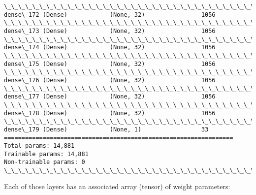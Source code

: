 \documentclass[11pt]{article}
\begin{document}
\begin{Verbatim}[commandchars=\\\{\}]
\_\_\_\_\_\_\_\_\_\_\_\_\_\_\_\_\_\_\_\_\_\_\_\_\_\_\_\_\_\_\_\_\_\_\_\_\_\_\_\_\_\_\_\_\_\_\_\_\_\_\_\_\_\_\_\_\_\_\_\_\_\_\_\_\_
dense\_172 (Dense)            (None, 32)                1056
\_\_\_\_\_\_\_\_\_\_\_\_\_\_\_\_\_\_\_\_\_\_\_\_\_\_\_\_\_\_\_\_\_\_\_\_\_\_\_\_\_\_\_\_\_\_\_\_\_\_\_\_\_\_\_\_\_\_\_\_\_\_\_\_\_
dense\_173 (Dense)            (None, 32)                1056
\_\_\_\_\_\_\_\_\_\_\_\_\_\_\_\_\_\_\_\_\_\_\_\_\_\_\_\_\_\_\_\_\_\_\_\_\_\_\_\_\_\_\_\_\_\_\_\_\_\_\_\_\_\_\_\_\_\_\_\_\_\_\_\_\_
dense\_174 (Dense)            (None, 32)                1056
\_\_\_\_\_\_\_\_\_\_\_\_\_\_\_\_\_\_\_\_\_\_\_\_\_\_\_\_\_\_\_\_\_\_\_\_\_\_\_\_\_\_\_\_\_\_\_\_\_\_\_\_\_\_\_\_\_\_\_\_\_\_\_\_\_
dense\_175 (Dense)            (None, 32)                1056
\_\_\_\_\_\_\_\_\_\_\_\_\_\_\_\_\_\_\_\_\_\_\_\_\_\_\_\_\_\_\_\_\_\_\_\_\_\_\_\_\_\_\_\_\_\_\_\_\_\_\_\_\_\_\_\_\_\_\_\_\_\_\_\_\_
dense\_176 (Dense)            (None, 32)                1056
\_\_\_\_\_\_\_\_\_\_\_\_\_\_\_\_\_\_\_\_\_\_\_\_\_\_\_\_\_\_\_\_\_\_\_\_\_\_\_\_\_\_\_\_\_\_\_\_\_\_\_\_\_\_\_\_\_\_\_\_\_\_\_\_\_
dense\_177 (Dense)            (None, 32)                1056
\_\_\_\_\_\_\_\_\_\_\_\_\_\_\_\_\_\_\_\_\_\_\_\_\_\_\_\_\_\_\_\_\_\_\_\_\_\_\_\_\_\_\_\_\_\_\_\_\_\_\_\_\_\_\_\_\_\_\_\_\_\_\_\_\_
dense\_178 (Dense)            (None, 32)                1056
\_\_\_\_\_\_\_\_\_\_\_\_\_\_\_\_\_\_\_\_\_\_\_\_\_\_\_\_\_\_\_\_\_\_\_\_\_\_\_\_\_\_\_\_\_\_\_\_\_\_\_\_\_\_\_\_\_\_\_\_\_\_\_\_\_
dense\_179 (Dense)            (None, 1)                 33
=================================================================
Total params: 14,881
Trainable params: 14,881
Non-trainable params: 0
\_\_\_\_\_\_\_\_\_\_\_\_\_\_\_\_\_\_\_\_\_\_\_\_\_\_\_\_\_\_\_\_\_\_\_\_\_\_\_\_\_\_\_\_\_\_\_\_\_\_\_\_\_\_\_\_\_\_\_\_\_\_\_\_\_
    \end{Verbatim}

\newpage

Each of those layers has an associated array (tensor) of weight parameters:
\end{document}
